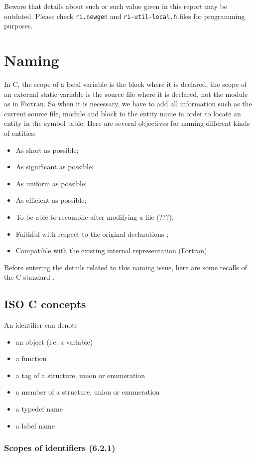 \documentclass[a4paper]{report}
\begin{document}
Beware that details about such or such value given in this report may
be outdated. Please check \verb/ri.newgen/ and \verb/ri-util-local.h/
files for programming purposes.


\chapter{Naming}
\label{chapter:naming}

In C, the scope of a local variable is the block where it is declared,
the scope of an external static variable is the source file where it
is declared, not the module as in Fortran. So when it is necessary, we
have to add all information such as the current source file, module
and block to the entity name in order to locate an entity in the
symbol table. Here are several objectives for naming different kinds
of entities:
\begin{itemize}
\item As short as possible;
\item As significant as possible;
\item As uniform as possible;
\item As efficient as possible;
\item To be able to recompile after modifying a file (???);
\item Faithful with respect to the original declarations ;
\item Compatible with the existing internal representation (Fortran).  
\end{itemize}
Before entering the details related to this naming issue, here are some
recalls of the C standard \cite{ISOC}.

\section{ISO C concepts}

An identifier can denote
\begin{itemize}
\item an object (i.e. a variable)
\item a function
\item a tag of a structure, union or enumeration
\item a member of a structure, union or enumeration
\item a typedef name
\item a label name
\end{itemize}

\subsection{Scopes of identifiers (6.2.1)}
\end{document}
